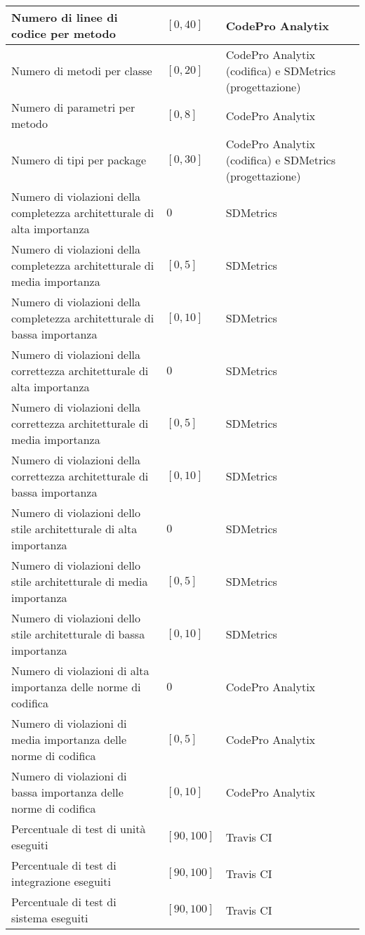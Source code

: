 \begin{longtable}{|p{}|p{}|p{}|}
	\hline 
	Numero di linee di codice per metodo &  $[0, 40]$ &  CodePro Analytix \\
	\hline 
	Numero di metodi per classe &  $[0, 20]$ &  CodePro Analytix (codifica) e SDMetrics (progettazione) \\
	\hline 
	Numero di parametri per metodo &  $[0, 8]$ &  CodePro Analytix \\
	\hline 
	Numero di tipi per package &  $[0, 30]$ &  CodePro Analytix (codifica) e SDMetrics (progettazione) \\
	\hline 
	Numero di violazioni della completezza architetturale di alta importanza &  $0$ &  SDMetrics \\
	\hline 
	Numero di violazioni della completezza architetturale di media importanza &  $[0, 5]$ &  SDMetrics \\
	\hline 
	Numero di violazioni della completezza architetturale di bassa importanza &  $[0, 10]$ &  SDMetrics \\
	\hline 
	Numero di violazioni della correttezza architetturale di alta importanza &  $0$ &  SDMetrics \\
	\hline 
	Numero di violazioni della correttezza architetturale di media importanza &  $[0, 5]$ &  SDMetrics \\
	\hline 
	Numero di violazioni della correttezza architetturale di bassa importanza &  $[0, 10]$ &  SDMetrics \\
	\hline 
	Numero di violazioni dello stile architetturale di alta importanza &  $0$ &  SDMetrics \\
	\hline 
	Numero di violazioni dello stile architetturale di media importanza &  $[0, 5]$ &  SDMetrics \\
	\hline 
	Numero di violazioni dello stile architetturale di bassa importanza &  $[0, 10]$ &  SDMetrics \\
	\hline 
	Numero di violazioni di alta importanza delle norme di codifica &  $0$ &  CodePro Analytix \\
	\hline 
	Numero di violazioni di media importanza delle norme di codifica &  $[0, 5]$ &  CodePro Analytix \\
	\hline 
	Numero di violazioni di bassa importanza delle norme di codifica &  $[0, 10]$ &  CodePro Analytix \\
	\hline 
	Percentuale di test di unità eseguiti &  $[90, 100]$ &  Travis CI \\
	\hline 
	Percentuale di test di integrazione eseguiti &  $[90, 100]$ &  Travis CI \\
	\hline 
	Percentuale di test di sistema eseguiti &  $[90, 100]$ &  Travis CI \\

\end{longtable}
